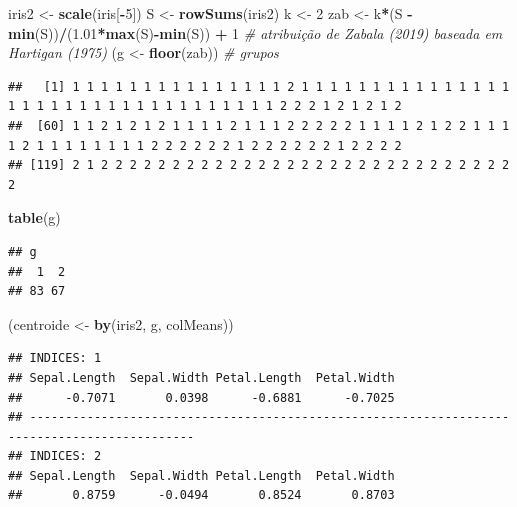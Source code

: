 \documentclass[
]{book}
\newenvironment{Shaded}{\begin{snugshade}}{\end{snugshade}}
\newcommand{\CommentTok}[1]{\textcolor[rgb]{0.56,0.35,0.01}{\textit{#1}}}
\newcommand{\DecValTok}[1]{\textcolor[rgb]{0.00,0.00,0.81}{#1}}
\newcommand{\FloatTok}[1]{\textcolor[rgb]{0.00,0.00,0.81}{#1}}
\newcommand{\KeywordTok}[1]{\textcolor[rgb]{0.13,0.29,0.53}{\textbf{#1}}}
\newcommand{\NormalTok}[1]{#1}
\newcommand{\OperatorTok}[1]{\textcolor[rgb]{0.81,0.36,0.00}{\textbf{#1}}}
\newcommand{\StringTok}[1]{\textcolor[rgb]{0.31,0.60,0.02}{#1}}
\theoremstyle{definition}
\theoremstyle{definition}
\theoremstyle{definition}
\theoremstyle{remark}
\begin{document}
\begin{Shaded}
\begin{Highlighting}[]
\NormalTok{iris2 \textless{}{-}}\StringTok{ }\KeywordTok{scale}\NormalTok{(iris[}\OperatorTok{{-}}\DecValTok{5}\NormalTok{])}
\NormalTok{S \textless{}{-}}\StringTok{ }\KeywordTok{rowSums}\NormalTok{(iris2)}
\NormalTok{k \textless{}{-}}\StringTok{ }\DecValTok{2}
\NormalTok{zab \textless{}{-}}\StringTok{ }\NormalTok{k}\OperatorTok{*}\NormalTok{(S }\OperatorTok{{-}}\StringTok{ }\KeywordTok{min}\NormalTok{(S))}\OperatorTok{/}\NormalTok{(}\FloatTok{1.01}\OperatorTok{*}\KeywordTok{max}\NormalTok{(S)}\OperatorTok{{-}}\KeywordTok{min}\NormalTok{(S)) }\OperatorTok{+}\StringTok{ }\DecValTok{1} \CommentTok{\# atribuição de Zabala (2019) baseada em Hartigan (1975)}
\NormalTok{(g \textless{}{-}}\StringTok{ }\KeywordTok{floor}\NormalTok{(zab)) }\CommentTok{\# grupos}
\end{Highlighting}
\end{Shaded}

\begin{verbatim}
##   [1] 1 1 1 1 1 1 1 1 1 1 1 1 1 1 1 2 1 1 1 1 1 1 1 1 1 1 1 1 1 1 1 1 1 1 1 1 1 1 1 1 1 1 1 1 1 1 1 1 1 1 2 2 2 1 2 1 2 1 2
##  [60] 1 1 2 1 2 1 2 1 1 1 1 2 1 1 1 2 2 2 2 2 1 1 1 1 2 1 2 2 1 1 1 1 2 1 1 1 1 1 1 1 1 2 2 2 2 2 2 1 2 2 2 2 2 2 1 2 2 2 2
## [119] 2 1 2 2 2 2 2 2 2 2 2 2 2 2 2 2 2 2 2 2 2 2 2 2 2 2 2 2 2 2 2 2
\end{verbatim}

\begin{Shaded}
\begin{Highlighting}[]
\KeywordTok{table}\NormalTok{(g)}
\end{Highlighting}
\end{Shaded}

\begin{verbatim}
## g
##  1  2 
## 83 67
\end{verbatim}

\begin{Shaded}
\begin{Highlighting}[]
\NormalTok{(centroide \textless{}{-}}\StringTok{ }\KeywordTok{by}\NormalTok{(iris2, g, colMeans))}
\end{Highlighting}
\end{Shaded}

\begin{verbatim}
## INDICES: 1
## Sepal.Length  Sepal.Width Petal.Length  Petal.Width 
##      -0.7071       0.0398      -0.6881      -0.7025 
## --------------------------------------------------------------------------------------------- 
## INDICES: 2
## Sepal.Length  Sepal.Width Petal.Length  Petal.Width 
##       0.8759      -0.0494       0.8524       0.8703
\end{verbatim}
\end{document}
